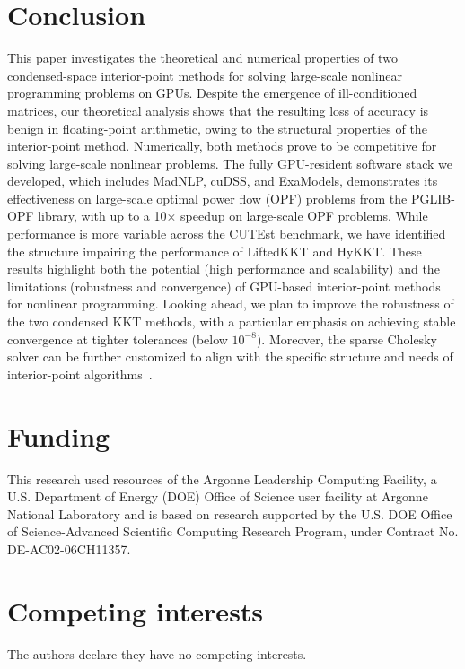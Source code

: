 \documentclass[smallextended]{svjour3}
\begin{document}




\section{Conclusion}
This paper investigates the theoretical and numerical properties of two condensed-space interior-point methods for solving large-scale nonlinear programming problems on GPUs.
Despite the emergence of ill-conditioned matrices, our theoretical analysis shows that the resulting loss of accuracy is benign in floating-point arithmetic, owing to the structural properties of the interior-point method.
Numerically, both methods prove to be competitive for solving large-scale nonlinear problems.
The fully GPU-resident software stack we developed, which includes MadNLP, cuDSS, and ExaModels, demonstrates its effectiveness on large-scale optimal power flow (OPF) problems from the PGLIB-OPF library,
with up to a 10× speedup on large-scale OPF problems.
While performance is more variable across the CUTEst benchmark, we have identified the structure impairing the performance of LiftedKKT and HyKKT.
These results highlight both the potential (high performance and scalability) and the limitations (robustness and convergence) of GPU-based interior-point methods for nonlinear programming.
Looking ahead, we plan to improve the robustness of the two condensed KKT methods, with a particular emphasis on achieving stable convergence at tighter tolerances (below $10^{-8}$).
Moreover, the sparse Cholesky solver can be further customized to align with the specific structure and needs of interior-point algorithms~\cite{wright1999modified}.

\section*{Funding}
This research used resources of the Argonne Leadership Computing Facility, a U.S. Department of Energy (DOE) Office of Science user facility at Argonne National Laboratory and is based on research supported by the U.S. DOE Office of Science-Advanced Scientific Computing Research Program, under Contract No. DE-AC02-06CH11357.

\section*{Competing interests}
The authors declare they have no competing interests.
\end{document}
